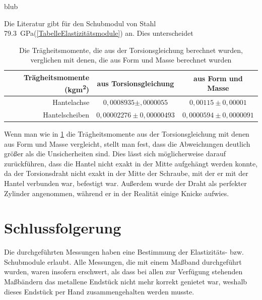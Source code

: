 \documentclass[
	a4paper,
	12pt,
	pagesize,
	ngerman
]{scrartcl}
\begin{document}
	blub%
	\\
	\par
	Die Literatur gibt für den Schubmodul von Stahl \SI{79,3}{\giga \pascal}(\cref{TabelleElastizitätsmodule}) an. Dies unterscheidet
	\par
	\begin{table}[tb]
		\centering
		\begin{tabular}{ r | c | c |}
			Trägheitsmomente (\si{kgm^2})& aus Torsionsgleichung & aus Form und Masse\\ \hline
			Hantelachse & $0,0008935 \pm ,0000055$ &$ 0,00115 \pm0,00001$\\
			Hantelscheiben & $0,00002276 \pm 0,00000493$ & $0,0000594\pm 0,0000091$\\ \hline
		\end{tabular}
		\caption{Die Trägheitsmomente, die aus der Torsionsgleichung berechnet wurden, verglichen mit denen, die aus Form und Masse berechnet wurden}
		\label{Trägheitsmomente_Vergleich} 
	\end{table}
	
	Wenn man wie in \cref{Trägheitsmomente_Vergleich} die Trägheitsmomente aus der Torsionsgleichung mit denen aus Form und Masse vergleicht, stellt man fest, dass die Abweichungen deutlich größer als die Unsicherheiten sind. Dies lässt sich möglicherweise darauf zurückführen, dass die Hantel nicht exakt in der Mitte aufgehängt werden konnte, da der Torsionsdraht nicht exakt in der Mitte der Schraube, mit der er mit der Hantel verbunden war, befestigt war. Außerdem wurde der Draht als perfekter Zylinder angenommen, während er in der Realität einige Knicke aufwies. %
	
	\section{Schlussfolgerung}
	Die durchgeführten Messungen haben eine Bestimmung der Elastizitäts- bzw. Schubmodule erlaubt.
	Alle Messungen, die mit einem Maßband durchgeführt wurden, waren insofern erschwert, als dass bei allen zur Verfügung stehenden Maßbändern das metallene Endstück nicht mehr korrekt genietet war, weshalb dieses Endstück per Hand zusammengehalten werden musste.
	\printbibliography
\end{document}

